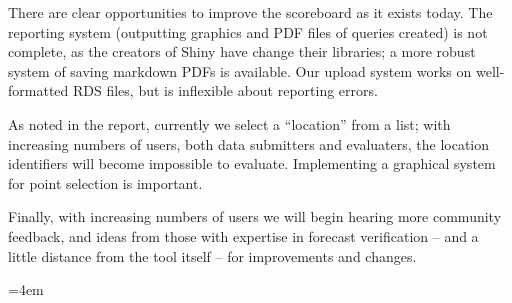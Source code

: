 \documentclass[logos,parttoc,morelanguage=french,morelanguage=german]{orsay-memoire}
\begin{document}
There are clear opportunities to improve the scoreboard as it exists today. The reporting system (outputting graphics and PDF files of queries created) is not complete, as the creators of Shiny have change their libraries; a more robust system of saving markdown PDFs is available. Our upload system works on well-formatted RDS files, but is inflexible about reporting errors.

As noted in the report, currently we select a ``location'' from a list; with increasing numbers of users, both data submitters and evaluaters, the location identifiers will become impossible to evaluate. Implementing a graphical system for point selection is important. 

Finally, with increasing numbers of users we will begin hearing more community feedback, and ideas from those with expertise in forecast verification -- and a little distance from the tool itself -- for improvements and changes.



\thispagestyle{empty}
\strut\newpage


\begin{thebibliography}{100}
	=4em
	\addtolength\leftskip{25pt}
	\setlength{}
	\addtolength\parskip{\smallskipamount}
\printbibliography 

\end{thebibliography}

\end{document}
